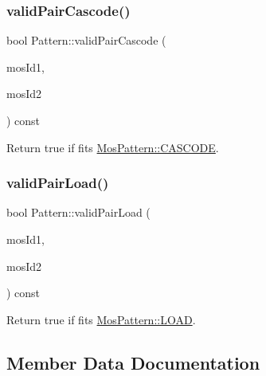 \subsubsection{\texorpdfstring{valid\+Pair\+Cascode()}{validPairCascode()}}
{\footnotesize\ttfamily bool Pattern\+::valid\+Pair\+Cascode (\begin{DoxyParamCaption}\item[{\hyperlink{type_8h_a581e8093e28e7362f2b6937296190676}{Index\+Type}}]{mos\+Id1,  }\item[{\hyperlink{type_8h_a581e8093e28e7362f2b6937296190676}{Index\+Type}}]{mos\+Id2 }\end{DoxyParamCaption}) const\hspace{0.3cm}{\ttfamily [private]}}



Return true if fits \hyperlink{type_8h_af19eddb079bfea723256710b029c38e8aac50017227efb09ec529757764e5187c}{Mos\+Pattern\+::\+C\+A\+S\+C\+O\+DE}. 

\mbox{\label{classPattern_acae638957d000c1a163f949c369d5ef4}} 
\subsubsection{\texorpdfstring{valid\+Pair\+Load()}{validPairLoad()}}
{\footnotesize\ttfamily bool Pattern\+::valid\+Pair\+Load (\begin{DoxyParamCaption}\item[{\hyperlink{type_8h_a581e8093e28e7362f2b6937296190676}{Index\+Type}}]{mos\+Id1,  }\item[{\hyperlink{type_8h_a581e8093e28e7362f2b6937296190676}{Index\+Type}}]{mos\+Id2 }\end{DoxyParamCaption}) const\hspace{0.3cm}{\ttfamily [private]}}



Return true if fits \hyperlink{type_8h_af19eddb079bfea723256710b029c38e8a615d2885ef7576cedd9aafbb2578f028}{Mos\+Pattern\+::\+L\+O\+AD}. 



\subsection{Member Data Documentation}
\mbox{\label{classPattern_a71ec4e16ee6088587cece41cb7b027a3}} 
